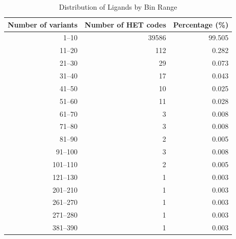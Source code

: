 \begin{table}[htbp]
    \centering
    \caption{Distribution of Ligands by Bin Range}
    \begin{tabular}{rrr}
        \toprule
        \textbf{Number of variants} & \textbf{Number of HET codes} & \textbf{Percentage (\%)} \\
        \midrule
        1--10 & \num{39586} & 99.505 \\
        11--20 & 112 & 0.282 \\
        21--30 & 29 & 0.073 \\
        31--40 & 17 & 0.043 \\
        41--50 & 10 & 0.025 \\
        51--60 & 11 & 0.028 \\
        61--70 & 3 & 0.008 \\
        71--80 & 3 & 0.008 \\
        81--90 & 2 & 0.005 \\
        91--100 & 3 & 0.008 \\
        101--110 & 2 & 0.005 \\
        121--130 & 1 & 0.003 \\
        201--210 & 1 & 0.003 \\
        261--270 & 1 & 0.003 \\
        271--280 & 1 & 0.003 \\
        381--390 & 1 & 0.003 \\
        \bottomrule
    \end{tabular}
    \label{tab:ligand_distribution}
\end{table}
